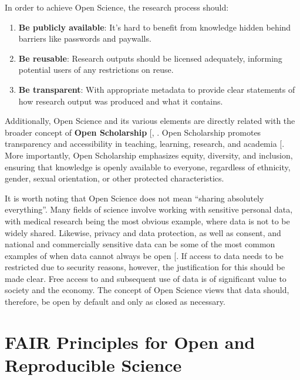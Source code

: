 \documentclass[
  11pt,
  letterpaper,
]{scrreprt}
\begin{document}
In order to achieve Open Science, the research process should:

\begin{enumerate}
\def\labelenumi{\arabic{enumi}.}
\item
  \textbf{Be publicly available}: It's hard to benefit from knowledge
  hidden behind barriers like passwords and paywalls.
\item
  \textbf{Be reusable}: Research outputs should be licensed adequately,
  informing potential users of any restrictions on reuse.
\item
  \textbf{Be transparent}: With appropriate metadata to provide clear
  statements of how research output was produced and what it contains.
\end{enumerate}

Additionally, Open Science and its various elements are directly related
with the broader concept of \textbf{Open Scholarship}
{[},
\citeproc{ref-tennant2019Foundations}{369}{]}. Open Scholarship promotes
transparency and accessibility in teaching, learning, research, and
academia {[}\citeproc{ref-emeryLibGuides}{370}{]}. More importantly,
Open Scholarship emphasizes equity, diversity, and inclusion, ensuring
that knowledge is openly available to everyone, regardless of ethnicity,
gender, sexual orientation, or other protected characteristics.

It is worth noting that Open Science does not mean ``sharing absolutely
everything''. Many fields of science involve working with sensitive
personal data, with medical research being the most obvious example,
where data is not to be widely shared. Likewise, privacy and data
protection, as well as consent, and national and commercially sensitive
data can be some of the most common examples of when data cannot always
be open {[}\citeproc{ref-regulation2016RegulationEU2016}{371}{]}. If
access to data needs to be restricted due to security reasons, however,
the justification for this should be made clear. Free access to and
subsequent use of data is of significant value to society and the
economy. The concept of Open Science views that data should, therefore,
be open by default and only as closed as necessary.

\section{FAIR Principles for Open and Reproducible
Science}\label{fair-principles-for-open-and-reproducible-science}
\end{document}
